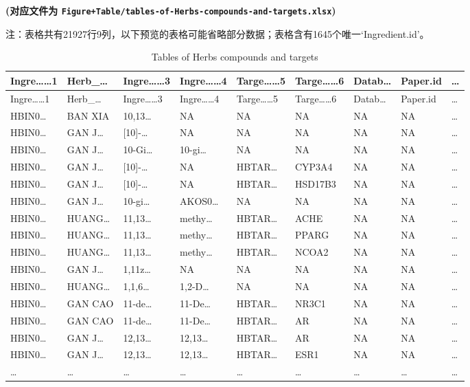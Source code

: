 \documentclass[
]{article}
\begin{document}
\textbf{(对应文件为 \texttt{Figure+Table/tables-of-Herbs-compounds-and-targets.xlsx})}

\begin{center}\begin{tcolorbox}[colback=gray!10, colframe=gray!50, width=0.9\linewidth, arc=1mm, boxrule=0.5pt]注：表格共有21927行9列，以下预览的表格可能省略部分数据；表格含有1645个唯一`Ingredient.id'。
\end{tcolorbox}
\end{center}

\begin{longtable}[]{@{}lllllllll@{}}
\caption{\label{tab:tables-of-Herbs-compounds-and-targets}Tables of Herbs compounds and targets}\tabularnewline
\toprule
Ingre\ldots\ldots1 & Herb\_\ldots{} & Ingre\ldots\ldots3 & Ingre\ldots\ldots4 & Targe\ldots\ldots5 & Targe\ldots\ldots6 & Datab\ldots{} & Paper.id & \ldots{}\tabularnewline
\midrule
\endfirsthead
\toprule
Ingre\ldots\ldots1 & Herb\_\ldots{} & Ingre\ldots\ldots3 & Ingre\ldots\ldots4 & Targe\ldots\ldots5 & Targe\ldots\ldots6 & Datab\ldots{} & Paper.id & \ldots{}\tabularnewline
\midrule
\endhead
HBIN0\ldots{} & BAN XIA & 10,13\ldots{} & NA & NA & NA & NA & NA & \ldots{}\tabularnewline
HBIN0\ldots{} & GAN J\ldots{} & {[}10{]}-\ldots{} & NA & NA & NA & NA & NA & \ldots{}\tabularnewline
HBIN0\ldots{} & GAN J\ldots{} & 10-Gi\ldots{} & 10-gi\ldots{} & NA & NA & NA & NA & \ldots{}\tabularnewline
HBIN0\ldots{} & GAN J\ldots{} & {[}10{]}-\ldots{} & NA & HBTAR\ldots{} & CYP3A4 & NA & NA & \ldots{}\tabularnewline
HBIN0\ldots{} & GAN J\ldots{} & {[}10{]}-\ldots{} & NA & HBTAR\ldots{} & HSD17B3 & NA & NA & \ldots{}\tabularnewline
HBIN0\ldots{} & GAN J\ldots{} & 10-gi\ldots{} & AKOS0\ldots{} & NA & NA & NA & NA & \ldots{}\tabularnewline
HBIN0\ldots{} & HUANG\ldots{} & 11,13\ldots{} & methy\ldots{} & HBTAR\ldots{} & ACHE & NA & NA & \ldots{}\tabularnewline
HBIN0\ldots{} & HUANG\ldots{} & 11,13\ldots{} & methy\ldots{} & HBTAR\ldots{} & PPARG & NA & NA & \ldots{}\tabularnewline
HBIN0\ldots{} & HUANG\ldots{} & 11,13\ldots{} & methy\ldots{} & HBTAR\ldots{} & NCOA2 & NA & NA & \ldots{}\tabularnewline
HBIN0\ldots{} & GAN J\ldots{} & 1,11z\ldots{} & NA & NA & NA & NA & NA & \ldots{}\tabularnewline
HBIN0\ldots{} & HUANG\ldots{} & 1,1,6\ldots{} & 1,2-D\ldots{} & NA & NA & NA & NA & \ldots{}\tabularnewline
HBIN0\ldots{} & GAN CAO & 11-de\ldots{} & 11-De\ldots{} & HBTAR\ldots{} & NR3C1 & NA & NA & \ldots{}\tabularnewline
HBIN0\ldots{} & GAN CAO & 11-de\ldots{} & 11-De\ldots{} & HBTAR\ldots{} & AR & NA & NA & \ldots{}\tabularnewline
HBIN0\ldots{} & GAN J\ldots{} & 12,13\ldots{} & 12,13\ldots{} & HBTAR\ldots{} & AR & NA & NA & \ldots{}\tabularnewline
HBIN0\ldots{} & GAN J\ldots{} & 12,13\ldots{} & 12,13\ldots{} & HBTAR\ldots{} & ESR1 & NA & NA & \ldots{}\tabularnewline
\ldots{} & \ldots{} & \ldots{} & \ldots{} & \ldots{} & \ldots{} & \ldots{} & \ldots{} & \ldots{}\tabularnewline
\bottomrule
\end{longtable}
\end{document}
